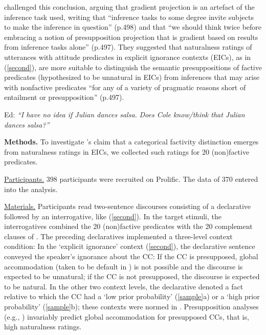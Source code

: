 \documentclass[12pt,fleqn]{article}
\newcommand{\6}{\mbox{$[\hspace*{-.6mm}[$}}
\newcommand{\9}{\mbox{$]\hspace*{-.6mm}]$}}
\newcommand{\citepos}[1]{\citeauthor{#1}'s \citeyear{#1}}
\begin{document}
\citealt{mandelkern-etal2020} challenged this conclusion, arguing that gradient projection is an artefact of the inference task used, writing that ``inference tasks to some degree invite subjects to make the inference in question'' (p.498) and that ``we should think twice before embracing a notion of presupposition projection that is gradient based on results from inference tasks alone'' (p.497). They suggested that naturalness ratings of utterances with attitude predicates in explicit ignorance contexts (EICs), as in (\ref{second}), are more suitable to distinguish the semantic presuppositions of factive predicates (hypothesized to be unnatural in EICs) from inferences that may arise with nonfactive predicates ``for any of a variety of pragmatic reasons short of entailment or presupposition'' (p.497).

\vspace*{-.2cm}
\begin{exe}
\ex\label{second} Ed: \hspace*{-.2cm} {\em ``I have no idea if Julian dances salsa.}  \hspace*{-.1cm} {\em Does Cole know/think that Julian dances salsa?''}
\end{exe}
\vspace*{-.2cm}

\noindent
{\bf Methods.} To investigate \citepos{mandelkern-etal2020} claim that a categorical factivity distinction emerges from naturalness ratings in EICs, we collected such ratings for 20 (non)factive predicates. 

\noindent
\underline{Participants.} 398 participants were recruited on Prolific. The data of 370 entered into the analysis. 

\noindent
\underline{Materials.} Participants read two-sentence discourses consisting of a declarative followed by an interrogative, like (\ref{second}). In the target stimuli, the interrogatives combined the 20 (non)factive predicates with the 20 complement clauses of \citealt{degen-tonhauser-openmind,degen-tonhauser-language}. The preceding declaratives implemented a three-level context condition: In the `explicit ignorance' context (\ref{second}), the declarative sentence conveyed the speaker's ignorance about the CC: If the CC is presupposed, global accommodation (taken to be default in \citealt{heim83,vds92}) is not possible and the discourse is expected to be unnatural; if the CC is not presupposed, the discourse is expected to be natural. In the other two context levels, the declarative denoted a fact relative to which the CC had a `low prior probability' (\ref{sample}a) or a `high prior probability' (\ref{sample}b); these contexts were normed in \citealt{degen-tonhauser-openmind}. Presupposition analyses (e.g., \citealt{heim83,vds92}) invariably predict global accommodation for presupposed CCs, that is, high naturalness ratings.
\end{document}
